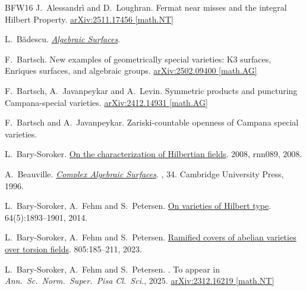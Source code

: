 \documentclass[10pt,a4paper]{amsart}
\theoremstyle{plain}
\theoremstyle{remark}
\numberwithin{theorem}{section}
\begin{document}
 
\begin{thebibliography}{BFW16}
J.~Alessandr\`i and D.~Loughran.
\newblock Fermat near misses and the integral Hilbert Property.
\newblock \href{https://doi.org/10.48550/arXiv.2511.17456}{arXiv:2511.17456 [math.NT]}

L.~B\u{a}descu.
\newblock \href{https://doi.org/10.1007/978-1-4757-3512-3}{\em Algebraic Surfaces}.

F.~Bartsch.
\newblock New examples of geometrically special varieties: K3 surfaces, Enriques surfaces, and algebraic groups. 
\newblock \href{https://doi.org/10.48550/arXiv.2502.09400} 	{arXiv:2502.09400 [math.AG]}

F.~Bartsch, A.~Javanpeykar and A.~Levin. 
\newblock Symmetric products and puncturing Campana-special varieties.
\newblock \href{https://arxiv.org/abs/2412.14931}{arXiv:2412.14931 [math.AG]}

F.~Bartsch and A.~Javanpeykar.
\newblock Zariski-countable openness of Campana special varieties.

L.~Bary-Soroker.
\newblock \href{https://doi.org/10.1093/imrn/rnn089}{On the characterization of Hilbertian fields}.
 2008, rnn089, 2008.

A.~Beauville.
\newblock \href{https://doi.org/10.1017/CBO9780511623936}{\em Complex Algebraic Surfaces}.
, 34. Cambridge University Press, 1996.

L.~Bary-Soroker, A.~Fehm and S.~Petersen.
\newblock  \href{https://eudml.org/doc/275596}{On varieties of Hilbert type}.
 64(5):1893--1901, 2014.

L.~Bary-Soroker, A.~Fehm and S.~Petersen.
\newblock \href{https://doi.org/10.1515/crelle-2023-0077}{Ramified covers of abelian varieties over torsion fields}.
 805:185--211, 2023.

L.~Bary-Soroker, A.~Fehm and S.~Petersen.
.
\newblock To appear in 
 {\em Ann.\ Sc.\ Norm.\ Super.\ Pisa Cl.\ Sci.}, 2025.
  \href{https://arxiv.org/abs/2312.16219}{arXiv:2312.16219 [math.NT]}


\end{thebibliography}
\end{document}
